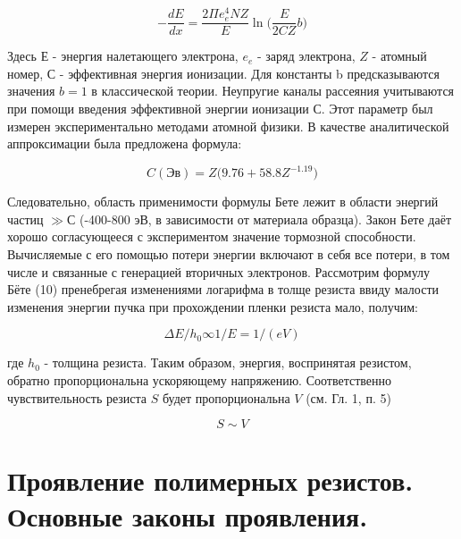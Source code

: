 \begin{equation}
-\frac{dE}{dx}=\frac{2\Pi e_e^4 NZ}{E} \ln {(}\frac{E}{2CZ}b{)}
\label{eq:A10}
\end{equation}

Здесь $Е$ - энергия налетающего электрона, $e_e$ - заряд электрона, $Z$ - атомный номер, $С$ - эффективная энергия ионизации. Для константы b предсказываются значения $b = 1$ в классической теории. Неупругие каналы рассеяния учитываются при помощи введения эффективной энергии ионизации С. Этот параметр был измерен экспериментально методами атомной физики. В качестве аналитической аппроксимации была предложена формула:

\begin{equation}
C(Эв)=Z{(}9.76+58.8Z^{-1.19}{)}
\label{eq:A11}
\end{equation}

Следовательно, область применимости формулы Бете лежит в области энергий частиц $\gg С$  (-400-800 эВ, в зависимости от материала образца). Закон Бете даёт хорошо согласующееся с экспериментом значение тормозной способности. Вычисляемые с его помощью потери энергии включают в себя все потери, в том числе и связанные с генерацией вторичных электронов.
Рассмотрим формулу Бёте (10) пренебрегая изменениями логарифма в толще резиста ввиду малости изменения энергии пучка при прохождении пленки резиста мало, получим:

\begin{equation}
\Delta E/h_0 \infty 1/E= 1/(eV)
\end{equation}

где $h_0$ - толщина резиста. Таким образом, энергия, воспринятая резистом, обратно пропорциональна ускоряющему напряжению. Соответственно чувствительность резиста $S$ будет пропорциональна $V$ (см. Гл. 1, п. 5)

\begin{equation}
S \sim V
\end{equation}

\section{Проявление полимерных резистов. Основные законы проявления.}

